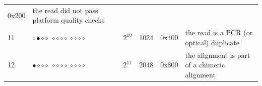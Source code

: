 \documentclass[]{krantz}
\begin{document}
\begin{longtable}[]{@{}llllll@{}}
\begin{minipage}[t]{0.09\columnwidth}
0x200\strut
\end{minipage} & \begin{minipage}[t]{0.35\columnwidth}\raggedright
the read did not pass platform
quality checks\strut
\end{minipage}\tabularnewline
\begin{minipage}[t]{0.09\columnwidth}\raggedright
11\strut
\end{minipage} & \begin{minipage}[t]{0.12\columnwidth}\raggedright
\({\circ}{\bullet}{\circ}{\circ}~{\circ}{\circ}{\circ}{\circ}~{\circ}{\circ}{\circ}{\circ}\)\strut
\end{minipage} & \begin{minipage}[t]{0.12\columnwidth}\raggedright
\(2^{10}\)\strut
\end{minipage} & \begin{minipage}[t]{0.07\columnwidth}\raggedright
1024\strut
\end{minipage} & \begin{minipage}[t]{0.09\columnwidth}\raggedright
0x400\strut
\end{minipage} & \begin{minipage}[t]{0.35\columnwidth}\raggedright
the read is a PCR (or optical)
duplicate\strut
\end{minipage}\tabularnewline
\begin{minipage}[t]{0.09\columnwidth}\raggedright
12\strut
\end{minipage} & \begin{minipage}[t]{0.12\columnwidth}\raggedright
\({\bullet}{\circ}{\circ}{\circ}~{\circ}{\circ}{\circ}{\circ}~{\circ}{\circ}{\circ}{\circ}\)\strut
\end{minipage} & \begin{minipage}[t]{0.12\columnwidth}\raggedright
\(2^{11}\)\strut
\end{minipage} & \begin{minipage}[t]{0.07\columnwidth}\raggedright
2048\strut
\end{minipage} & \begin{minipage}[t]{0.09\columnwidth}\raggedright
0x800\strut
\end{minipage} & \begin{minipage}[t]{0.35\columnwidth}\raggedright
the alignment is part of a
chimeric alignment\strut
\end{minipage}\tabularnewline
\bottomrule
\end{longtable}
\end{document}
